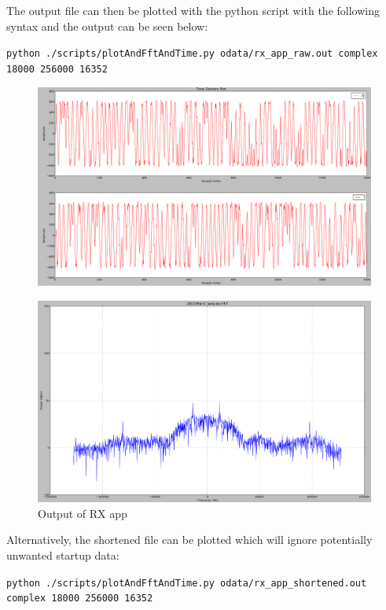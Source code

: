\noindent The output file can then be plotted with the python script with the following syntax and the output can be seen below:\par\medskip
\noindent\texttt{python ./scripts/plotAndFftAndTime.py odata/rx\_app\_raw.out complex 18000 256000 16352}\par
	\begin{figure}[h]
	 	\centering
		\includegraphics[scale=.2]{rx_app_iq_plot}
		\label{fig:rx_app_iq_plot}
	\end{figure}
	\begin{figure}[h]
	 	\centering
		\includegraphics[scale=.2]{rx_app_fft_plot}
		\caption{Output of RX app}
		\label{fig:rx_app_fft_plot}
	\end{figure}
\noindent Alternatively, the shortened file can be plotted which will ignore potentially unwanted startup data:\par\medskip
\noindent\texttt{python ./scripts/plotAndFftAndTime.py odata/rx\_app\_shortened.out complex 18000 256000 16352}\par\medskip
